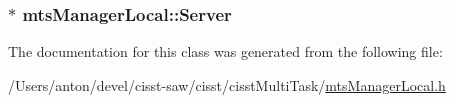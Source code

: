 \subsubsection[{Server}]{$\ast$ mts\+Manager\+Local\+::\+Server}\label{classmts_manager_local_ab191b8b4a89a550336c9ce2273b5fd49}


The documentation for this class was generated from the following file\+:\begin{DoxyCompactItemize}
\item 
/\+Users/anton/devel/cisst-\/saw/cisst/cisst\+Multi\+Task/\hyperlink{mts_manager_local_8h}{mts\+Manager\+Local.\+h}\end{DoxyCompactItemize}

